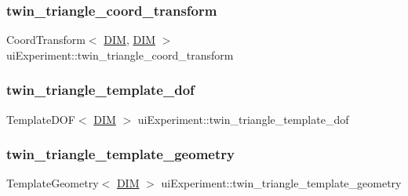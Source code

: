 \subsubsection{\texorpdfstring{twin\+\_\+triangle\+\_\+coord\+\_\+transform}{twin\_triangle\_coord\_transform}}
{\footnotesize\ttfamily Coord\+Transform$<$ \mbox{\hyperlink{complex__node___t_h_f_e_m_2uiexp_8h_a589b8b9bfdf714f736059845d568b597}{D\+IM}}, \mbox{\hyperlink{complex__node___t_h_f_e_m_2uiexp_8h_a589b8b9bfdf714f736059845d568b597}{D\+IM}} $>$ ui\+Experiment\+::twin\+\_\+triangle\+\_\+coord\+\_\+transform\hspace{0.3cm}{\ttfamily [private]}}

\mbox{\label{classui_experiment_a4f54e2b65f1b693be17259d4ec19e93b}} 
\subsubsection{\texorpdfstring{twin\+\_\+triangle\+\_\+template\+\_\+dof}{twin\_triangle\_template\_dof}}
{\footnotesize\ttfamily Template\+D\+OF$<$ \mbox{\hyperlink{complex__node___t_h_f_e_m_2uiexp_8h_a589b8b9bfdf714f736059845d568b597}{D\+IM}} $>$ ui\+Experiment\+::twin\+\_\+triangle\+\_\+template\+\_\+dof\hspace{0.3cm}{\ttfamily [private]}}

\mbox{\label{classui_experiment_a880d54a1384f86b7bacc8dfb476a20e6}} 
\subsubsection{\texorpdfstring{twin\+\_\+triangle\+\_\+template\+\_\+geometry}{twin\_triangle\_template\_geometry}}
{\footnotesize\ttfamily Template\+Geometry$<$ \mbox{\hyperlink{complex__node___t_h_f_e_m_2uiexp_8h_a589b8b9bfdf714f736059845d568b597}{D\+IM}} $>$ ui\+Experiment\+::twin\+\_\+triangle\+\_\+template\+\_\+geometry\hspace{0.3cm}{\ttfamily [private]}}

